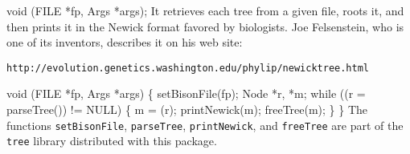 \nwenddocs{}\endmoddef\nwstartdeflinemarkup{}\nwenddeflinemarkup
void (FILE *fp, Args *args);
\nwendcode{}\nwdocspar
It retrieves each tree from a given file, roots it, and then prints it
in the Newick format favored by biologists. Joe Felsenstein, who is
one of its inventors, describes it on his web site:
\small
\begin{verbatim}
http://evolution.genetics.washington.edu/phylip/newicktree.html
\end{verbatim}
\normalsize
\nwenddocs{}\endmoddef\nwstartdeflinemarkup{}\nwenddeflinemarkup
void (FILE *fp, Args *args) \{
  setBisonFile(fp);
  Node *r, *m;
  while ((r = parseTree()) != NULL) \{
    m = (r);
    printNewick(m);
    freeTree(m);
  \}
\}
\nwendcode{}\nwdocspar
The functions \texttt{setBisonFile}, \texttt{parseTree},
\texttt{printNewick}, and \texttt{freeTree} are part of the
\texttt{tree} library distributed with this package.
\nwenddocs{}\plusendmoddef\nwstartdeflinemarkup{}\nwenddeflinemarkup

